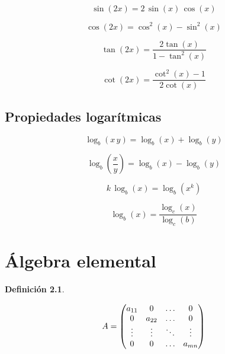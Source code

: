 \documentclass[a5paper,12pt,twoside]{book}
\newtheorem{defn}{{Definición}}[chapter]
\begin{document}
\begin{equation*}
    \sin{(2x)}=2 \, \sin{(x)} \, \cos{(x)}
\end{equation*}

\begin{equation*}
    \cos{(2x)}=\cos^2{(x)}-\sin^2{(x)}
\end{equation*}

\begin{equation*}
    \tan{(2x)}=\dfrac{2\tan{(x)}}{1-\tan^2{(x)}}
\end{equation*}

\begin{equation*}
    \cot{(2x)}=\dfrac{\cot^2{(x)}-1}{2\cot{(x)}}
\end{equation*}


\section{Propiedades logarítmicas}

\begin{equation*}
    \log_b{(x \, y)} = \log_b{(x)} + \log_b{(y)}
\end{equation*}

\begin{equation*}
    \log_b{\left( \frac{x}{y} \right)} = \log_b{(x)} - \log_b{(y)}
\end{equation*}

\begin{equation*}
    k \, \log_b{(x)} = \log_b{\left( x^k \right)}
\end{equation*}

\begin{equation*}
    \log_b{(x)}=\frac{\log_c{(x)}}{\log_c{(b)}}
\end{equation*}


\chapter{Álgebra elemental}

\begin{mdframed}[style=MyFrame1]
    \begin{defn}
    \end{defn}
    \begin{equation*}
        A =
        \begin{pmatrix}
            a_{11} & 0 & \dots & 0
            \\
            0 & a_{22} & \dots & 0
            \\
            \vdots & \vdots & \ddots & \vdots
            \\
            0 & 0 & \dots & a_{mn}
        \end{pmatrix}
    \end{equation*}
\end{mdframed}
\end{document}
